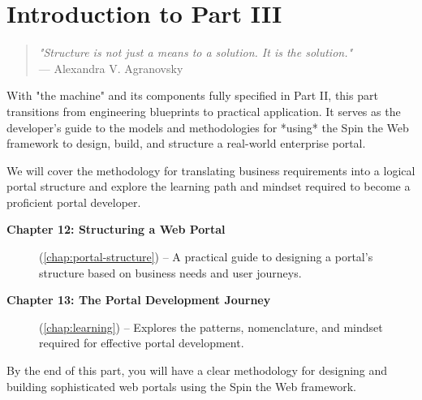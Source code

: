 
\chapter*{Introduction to Part III}
\label{part:implementation}

\begin{quote}
\textit{"Structure is not just a means to a solution. It is the solution."} \\
— Alexandra V. Agranovsky
\end{quote}

With "the machine" and its components fully specified in Part II, this part transitions from engineering blueprints to practical application. It serves as the developer's guide to the models and methodologies for *using* the Spin the Web framework to design, build, and structure a real-world enterprise portal.

We will cover the methodology for translating business requirements into a logical portal structure and explore the learning path and mindset required to become a proficient portal developer.
\begin{description}
\item[\textbf{Chapter 12: Structuring a Web Portal}] (\cref{chap:portal-structure}) -- A practical guide to designing a portal's structure based on business needs and user journeys.

\item[\textbf{Chapter 13: The Portal Development Journey}] (\cref{chap:learning}) -- Explores the patterns, nomenclature, and mindset required for effective portal development.
\end{description}

By the end of this part, you will have a clear methodology for designing and building sophisticated web portals using the Spin the Web framework.
